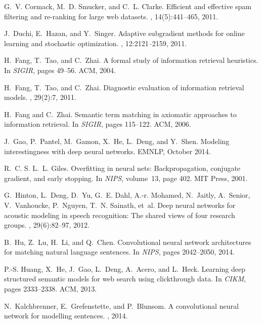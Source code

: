 \documentclass{sig-alternate-05-2015}
\begin{document}
{\begin{thebibliography}{10}
G.~V. Cormack, M.~D. Smucker, and C.~L. Clarke.
\newblock Efficient and effective spam filtering and re-ranking for large web
  datasets.
, 14(5):441--465, 2011.

J.~Duchi, E.~Hazan, and Y.~Singer.
\newblock Adaptive subgradient methods for online learning and stochastic
  optimization.
, 12:2121--2159, 2011.

H.~Fang, T.~Tao, and C.~Zhai.
\newblock A formal study of information retrieval heuristics.
\newblock In {\em SIGIR}, pages 49--56. ACM, 2004.

H.~Fang, T.~Tao, and C.~Zhai.
\newblock Diagnostic evaluation of information retrieval models.
, 29(2):7, 2011.

H.~Fang and C.~Zhai.
\newblock Semantic term matching in axiomatic approaches to information
  retrieval.
\newblock In {\em SIGIR}, pages 115--122. ACM, 2006.

J.~Gao, P.~Pantel, M.~Gamon, X.~He, L.~Deng, and Y.~Shen.
\newblock Modeling interestingness with deep neural networks.
\newblock EMNLP, October 2014.

R.~C. S. L.~L. Giles.
\newblock Overfitting in neural nets: Backpropagation, conjugate gradient, and
  early stopping.
\newblock In {\em NIPS}, volume~13, page 402. MIT Press, 2001.

G.~Hinton, L.~Deng, D.~Yu, G.~E. Dahl, A.-r. Mohamed, N.~Jaitly, A.~Senior,
  V.~Vanhoucke, P.~Nguyen, T.~N. Sainath, et~al.
\newblock Deep neural networks for acoustic modeling in speech recognition: The
  shared views of four research groups.
, 29(6):82--97, 2012.

B.~Hu, Z.~Lu, H.~Li, and Q.~Chen.
\newblock Convolutional neural network architectures for matching natural
  language sentences.
\newblock In {\em NIPS}, pages 2042--2050, 2014.

P.-S. Huang, X.~He, J.~Gao, L.~Deng, A.~Acero, and L.~Heck.
\newblock Learning deep structured semantic models for web search using
  clickthrough data.
\newblock In {\em CIKM}, pages 2333--2338. ACM, 2013.

N.~Kalchbrenner, E.~Grefenstette, and P.~Blunsom.
\newblock A convolutional neural network for modelling sentences.
, 2014.


\end{thebibliography}}
\end{document}

